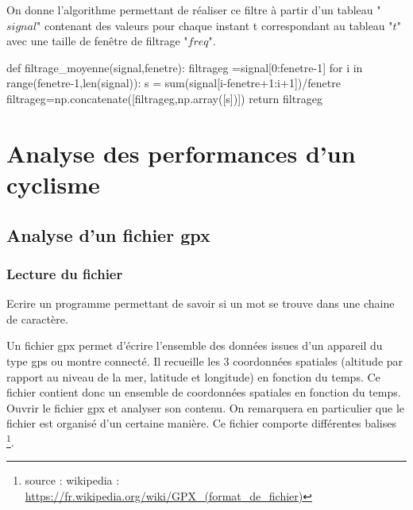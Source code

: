 On donne l'algorithme permettant de réaliser ce filtre à partir d'un tableau "$signal$" contenant des valeurs pour chaque instant t correspondant au tableau "$t$" avec une taille de fenêtre de filtrage "$freq$".

\begin{pyverbatim}
def filtrage_moyenne(signal,fenetre):
    filtrageg =signal[0:fenetre-1]
    for i in range(fenetre-1,len(signal)):
        s = sum(signal[i-fenetre+1:i+1])/fenetre
        filtrageg=np.concatenate([filtrageg,np.array([s])])
    return filtrageg
\end{pyverbatim}


\section{Analyse des performances d'un cyclisme}

\subsection{Analyse d'un fichier gpx}

\subsubsection{Lecture du fichier}

\question{} Ecrire un programme permettant de savoir si un mot se trouve dans une chaine de caractère.

Un fichier gpx permet d'écrire l'ensemble des données issues d'un appareil du type gps ou montre connecté. Il recueille les 3 coordonnées spatiales (altitude par rapport au niveau de la mer, latitude et longitude) en fonction du temps. Ce fichier contient donc un ensemble de coordonnées spatiales en fonction du temps.
Ouvrir le fichier gpx et analyser son contenu.
On remarquera en particulier que le fichier est organisé d'un certaine manière. Ce fichier comporte différentes balises \footnote{source : wikipedia : \url{https://fr.wikipedia.org/wiki/GPX_(format_de_fichier)}}.


